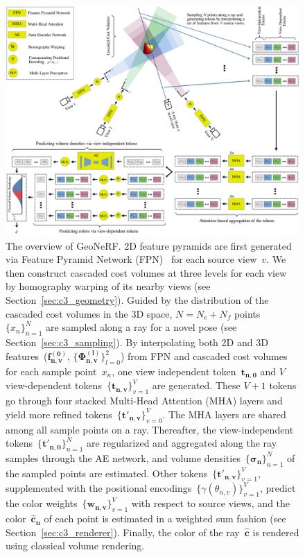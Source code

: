 \begin{figure}[!t]
    \begin{center}
        \includegraphics[width=1.0\linewidth]{images/chapter3/figures/GeoNeRF.jpg}
    \end{center}
   \caption{The overview of GeoNeRF. 2D feature pyramids are first generated via Feature Pyramid Network (FPN)~\citep{lin2017feature} for each source view~$v$. We then construct cascaded cost volumes at three levels for each view by homography warping of its nearby views (see Section~\ref{sec:c3_geometry}). Guided by the distribution of the cascaded cost volumes in the 3D space, $N=N_{c}+N_{f}$ points~$\{x_{n}\}_{n=1}^{N}$ are sampled along a ray for a novel pose (see Section~\ref{sec:c3_sampling}). By interpolating both 2D and 3D features~($\boldsymbol{f_{n,v}^{(0)}}$, $\{\boldsymbol{\Phi_{n,v}^{(l)}}\}_{l=0}^{2}$) from FPN and cascaded cost volumes for each sample point~$x_{n}$, one view independent token~$\boldsymbol{t_{n,0}}$ and $V$ view-dependent tokens~$\{\boldsymbol{t_{n,v}}\}_{v=1}^{V}$ are generated. These $V+1$ tokens go through four stacked Multi-Head Attention (MHA) layers and yield more refined tokens~$\{\boldsymbol{t'_{n,v}}\}_{v=0}^{V}$. The MHA layers are shared among all sample points on a ray. Thereafter, the view-independent tokens~$\{\boldsymbol{t'_{n,0}}\}_{n=1}^{N}$ are regularized and aggregated along the ray samples through the AE network, and volume densities~$\{\boldsymbol{\sigma_{n}}\}_{n=1}^{N}$ of the sampled points are estimated. Other tokens~$\{\boldsymbol{t'_{n,v}}\}_{v=1}^{V}$, supplemented with the positional encodings~$\{\gamma(\theta_{n,v})\}_{v=1}^{V}$, predict the color weights~$\{\boldsymbol{w_{n,v}}\}_{v=1}^{V}$ with respect to source views, and the color~$\boldsymbol{\hat{c}_{n}}$ of each point is estimated in a weighted sum fashion (see Section~\ref{sec:c3_renderer}). Finally, the color of the ray~$\boldsymbol{\hat{c}}$ is rendered using classical volume rendering.}
    \label{fig:c3_arch}
\end{figure}

